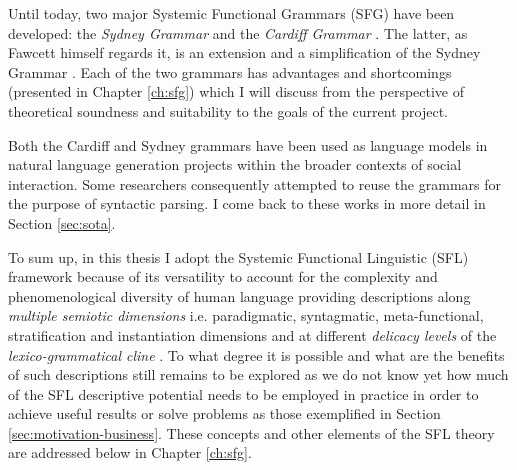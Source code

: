 % 
Until today, two major Systemic Functional Grammars (SFG) have been developed: the \textit{Sydney Grammar} \citep{Halliday2013} and the \textit{Cardiff Grammar} \citep{Fawcett2008}. The latter, as Fawcett himself regards it, is an extension and a simplification of the Sydney Grammar \citep[xviii]{Fawcett2008}. Each of the two grammars has advantages and shortcomings (presented in Chapter \ref{ch:sfg}) which I will discuss from the perspective of theoretical soundness and suitability to the goals of the current project.

Both the Cardiff and Sydney grammars have been used as language models in natural language generation projects within the broader contexts of social interaction. Some researchers \citep{Kasper1988, ODonoghue1991a, ODonnell1993, Souter1996, Day2007} consequently attempted to reuse the grammars for the purpose of syntactic parsing.
I come back to these works in more detail in Section \ref{sec:sota}.


To sum up, in this thesis I adopt the Systemic Functional Linguistic (SFL) framework because of its versatility to account for the complexity and phenomenological diversity of human language providing descriptions along \textit{multiple semiotic dimensions} i.e. paradigmatic, syntagmatic, meta-functional, stratification and instantiation dimensions \citep{Halliday2003} and at different \textit{delicacy levels} of the \textit{lexico-grammatical cline} \citep{Halliday2002, Hasan2014}. To what degree it is possible and what are the benefits of such descriptions still remains to be explored as we do not know yet how much of the SFL descriptive potential needs to be employed in practice in order to achieve useful results or solve problems as those exemplified in Section \ref{sec:motivation-business}. These concepts and other elements of the SFL theory are addressed below in Chapter \ref{ch:sfg}.


